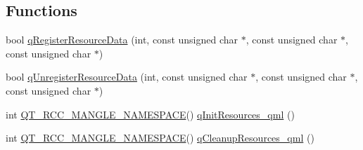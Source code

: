 \subsection*{Functions}
\begin{DoxyCompactItemize}
\item 
bool \hyperlink{build-analizer__host-_desktop___qt__5__9__0___g_c_c__64bit-_release_2qrc__qml_8cpp_a2ce5a6cde5b318dc75442940471e05f7}{q\+Register\+Resource\+Data} (int, const unsigned char $\ast$, const unsigned char $\ast$, const unsigned char $\ast$)
\item 
bool \hyperlink{build-analizer__host-_desktop___qt__5__9__0___g_c_c__64bit-_release_2qrc__qml_8cpp_a54b96c9f44d004fc0ea13bb581f97a71}{q\+Unregister\+Resource\+Data} (int, const unsigned char $\ast$, const unsigned char $\ast$, const unsigned char $\ast$)
\item 
int \hyperlink{build-analizer__host-_desktop___qt__5__9__0___g_c_c__64bit-_release_2qrc__qml_8cpp_a590f80ddb226779f6f432d80438ea190}{Q\+T\+\_\+\+R\+C\+C\+\_\+\+M\+A\+N\+G\+L\+E\+\_\+\+N\+A\+M\+E\+S\+P\+A\+C\+E}() \hyperlink{build-analizer__host-_desktop___qt__5__9__0___g_c_c__64bit-_release_2qrc__qml_8cpp_a68995df47257e443e5ab606848a493fc}{q\+Init\+Resources\+\_\+qml} ()
\item 
int \hyperlink{build-analizer__host-_desktop___qt__5__9__0___g_c_c__64bit-_release_2qrc__qml_8cpp_a590f80ddb226779f6f432d80438ea190}{Q\+T\+\_\+\+R\+C\+C\+\_\+\+M\+A\+N\+G\+L\+E\+\_\+\+N\+A\+M\+E\+S\+P\+A\+C\+E}() \hyperlink{build-analizer__host-_desktop___qt__5__9__0___g_c_c__64bit-_release_2qrc__qml_8cpp_a83e03aa6ea6d409abf7c8ccfc5746ef0}{q\+Cleanup\+Resources\+\_\+qml} ()
\end{DoxyCompactItemize}


